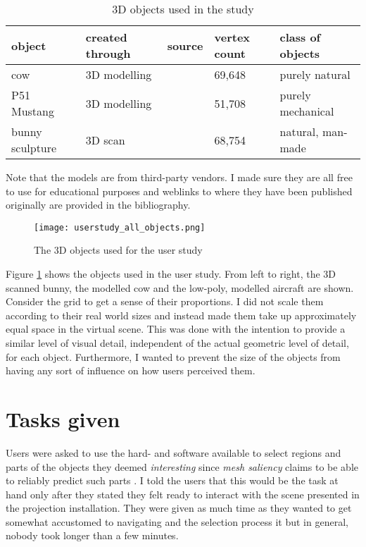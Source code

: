 \begin{table}[]
\centering
	\begin{tabular}{l|l|l|l|l}
		object	& created through	& source	& vertex count	& class of objects	\\ \hline
		cow	& 3D modelling		& \cite{cow}	& 69,648	& purely natural	\\
		P51 Mustang	&	3D modelling	& \cite{P51}	& 51,708	& purely mechanical	\\
		bunny sculpture	&	3D scan	& \cite{bun}	& 68,754	& natural, man-made	
	\end{tabular}
	\caption{3D objects used in the study}
	\label{tab:userstudy_objects}
\end{table}

Note that the models are from third-party vendors. I made sure they are all free to use for educational purposes and weblinks to where they have been published originally are provided in the bibliography.

\begin{figure}[htb]
  \centering
  \texttt{[image: userstudy\_all\_objects.png]}\\ %
  \caption{The 3D objects used for the user study}\label{fig:all_objects}
\end{figure}

Figure \ref{fig:all_objects} shows the objects used in the user study. From left to right, the 3D scanned bunny, the modelled cow and the low-poly, modelled aircraft are shown. Consider the grid to get a sense of their proportions. I did not scale them according to their real world sizes and instead made them take up approximately equal space in the virtual scene. This was done with the intention to provide a similar level of visual detail, independent of the actual geometric level of detail, for each object. Furthermore, I wanted to prevent the size of the objects from having any sort of influence on how users perceived them.


\section{Tasks given}
\label{tasks_given}
%
%

Users were asked to use the hard- and software available to select regions and parts of the objects they deemed \textit{interesting} since \textit{mesh saliency} claims to be able to reliably predict such parts \cite{lee2005mesh}. I told the users that this would be the task at hand only after they stated they felt ready to interact with the scene presented in the projection installation. They were given as much time as they wanted to get somewhat accustomed to navigating and the selection process it but in general, nobody took longer than a few minutes.

